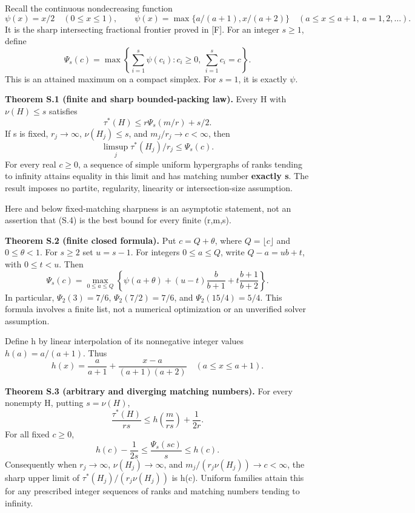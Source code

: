 \documentclass[
  11pt,
]{article}
\begin{document}
Recall the continuous nondecreasing function \[
 \psi(x)=x/2\quad(0\le x\le1),\qquad
 \psi(x)=\max\{a/(a+1),x/(a+2)\}
            \quad(a\le x\le a+1,\ a=1,2,\ldots).           \tag{S.2}
\] It is the sharp intersecting fractional frontier proved in {[}F{]}.
For an integer \(s\ge1\), define \[
 \boxed{\displaystyle
 \Psi_s(c)=\max\left\{\sum_{i=1}^s\psi(c_i):
              c_i\ge0,\ \sum_{i=1}^sc_i=c\right\}.}        \tag{S.3}
\] This is an attained maximum on a compact simplex. For \(s=1\), it is
exactly \(\psi\).

\textbf{Theorem S.1 (finite and sharp bounded-packing law).} Every H
with \(\nu(H)\le s\) satisfies \[
                  \tau^*(H)\le r\Psi_s(m/r)+s/2.           \tag{S.4}
\] If s is fixed, \(r_j\to\infty\), \(\nu(H_j)\le s\), and
\(m_j/r_j\to c<\infty\), then \[
                  \limsup_j\tau^*(H_j)/r_j\le\Psi_s(c).    \tag{S.5}
\] For every real \(c\ge0\), a sequence of simple uniform hypergraphs of
ranks tending to infinity attains equality in this limit and has
matching number \textbf{exactly s}. The result imposes no partite,
regularity, linearity or intersection-size assumption.

Here and below fixed-matching sharpness is an asymptotic statement, not
an assertion that (S.4) is the best bound for every finite (r,m,s).

\textbf{Theorem S.2 (finite closed formula).} Put \(c=Q+\theta\), where
\(Q=\lfloor c\rfloor\) and \(0\le\theta<1\). For \(s\ge2\) set
\(u=s-1\). For integers \(0\le a\le Q\), write \(Q-a=ub+t\), with
\(0\le t<u\). Then \[
 \boxed{\displaystyle
 \Psi_s(c)=\max_{0\le a\le Q}
 \left\{\psi(a+\theta)
       +(u-t)\frac{b}{b+1}+t\frac{b+1}{b+2}\right\}.}      \tag{S.6}
\] In particular, \(\Psi_2(3)=7/6\), \(\Psi_2(7/2)=7/6\), and
\(\Psi_2(15/4)=5/4\). This formula involves a finite list, not a
numerical optimization or an unverified solver assumption.

Define h by linear interpolation of its nonnegative integer values
\(h(a)=a/(a+1)\). Thus \[
 h(x)=\frac{a}{a+1}+
       \frac{x-a}{(a+1)(a+2)}\quad(a\le x\le a+1).          \tag{S.7}
\]

\textbf{Theorem S.3 (arbitrary and diverging matching numbers).} For
every nonempty H, putting \(s=\nu(H)\), \[
 \frac{\tau^*(H)}{r s}\le h\!\left(\frac{m}{r s}\right)
                                      +\frac1{2r}.         \tag{S.8}
\] For all fixed \(c\ge0\), \[
            h(c)-\frac1{2s}\le\frac{\Psi_s(sc)}s\le h(c).   \tag{S.9}
\] Consequently when \(r_j\to\infty\), \(\nu(H_j)\to\infty\), and
\(m_j/(r_j\nu(H_j))\to c<\infty\), the sharp upper limit of
\(\tau^*(H_j)/(r_j\nu(H_j))\) is h(c). Uniform families attain this for
any prescribed integer sequences of ranks and matching numbers tending
to infinity.
\end{document}
